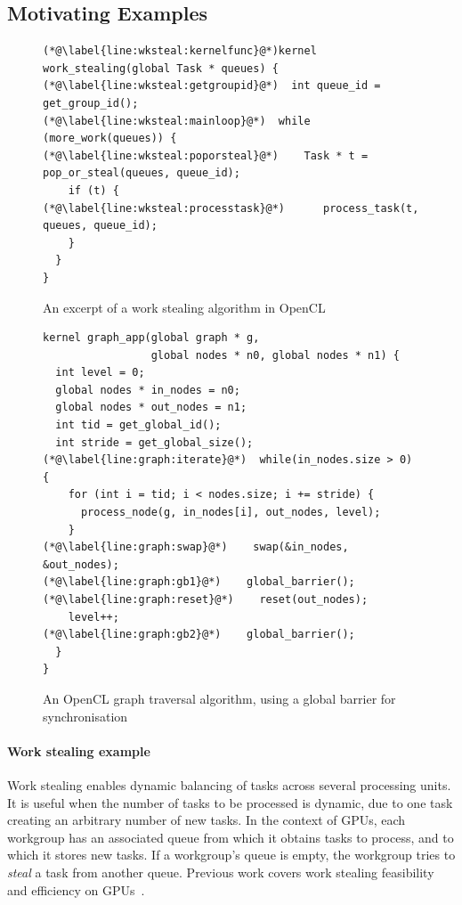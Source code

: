 \documentclass[numbers,nocopyrightspace,10pt]{sigplanconf}
\begin{document}
\subsection{Motivating Examples}\label{sec:openclexamples}

\begin{figure}

\begin{lstlisting}
(*@\label{line:wksteal:kernelfunc}@*)kernel work_stealing(global Task * queues) {
(*@\label{line:wksteal:getgroupid}@*)  int queue_id = get_group_id();
(*@\label{line:wksteal:mainloop}@*)  while (more_work(queues)) {
(*@\label{line:wksteal:poporsteal}@*)    Task * t = pop_or_steal(queues, queue_id);
    if (t) {
(*@\label{line:wksteal:processtask}@*)      process_task(t, queues, queue_id);
    }
  }
}
\end{lstlisting}

\caption{An excerpt of a work stealing algorithm in OpenCL}\label{fig:workstealing}
\end{figure}

\begin{figure}

\begin{lstlisting}
kernel graph_app(global graph * g, 
                 global nodes * n0, global nodes * n1) {
  int level = 0;
  global nodes * in_nodes = n0;
  global nodes * out_nodes = n1;
  int tid = get_global_id();
  int stride = get_global_size();
(*@\label{line:graph:iterate}@*)  while(in_nodes.size > 0) {
    for (int i = tid; i < nodes.size; i += stride) {
      process_node(g, in_nodes[i], out_nodes, level);
    }
(*@\label{line:graph:swap}@*)    swap(&in_nodes, &out_nodes);
(*@\label{line:graph:gb1}@*)    global_barrier();
(*@\label{line:graph:reset}@*)    reset(out_nodes);
    level++;
(*@\label{line:graph:gb2}@*)    global_barrier();
  }
}
\end{lstlisting}
\caption{An OpenCL graph traversal algorithm, using a global barrier for synchronisation}\label{fig:graphsearch}
\end{figure}

\paragraph{Work stealing example}
%
Work stealing enables dynamic balancing of tasks across several
processing units. It is useful when the number of tasks to be
processed is dynamic, due to one task creating an arbitrary number of new tasks.  In the context
of GPUs, each workgroup has an associated queue from which it
obtains tasks to process, and to which it stores new
tasks. If a workgroup's queue is empty, the workgroup tries to \emph{steal} a task from another
queue. Previous work covers work stealing feasibility and efficiency on GPUs~\cite{DBLP:conf/egh/CedermanT08,TPO10}.
\end{document}
